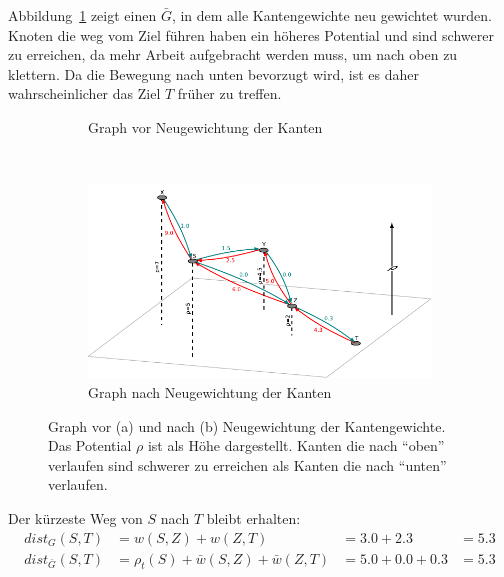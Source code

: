 Abbildung~\ref{fig:astar} zeigt einen $\bar{G}$, in dem alle Kantengewichte neu gewichtet wurden.
Knoten die weg vom Ziel führen haben ein höheres Potential und sind schwerer zu erreichen, da mehr
Arbeit aufgebracht werden muss, um nach oben zu klettern. Da die Bewegung nach unten bevorzugt wird,
ist es daher wahrscheinlicher das Ziel $T$ früher zu treffen.\\
\begin{figure}[h]
    \centering
    \begin{subfigure}[b]{\textwidth}
        \centering
        
        \caption{Graph vor Neugewichtung der Kanten}
    \end{subfigure}
    \\[1em]
    \begin{subfigure}[b]{\textwidth}
        \centering
        \includegraphics{figures/figure_astar_after_pp.pdf}
        \caption{Graph nach Neugewichtung der Kanten}
    \end{subfigure}
    \caption{Graph vor (a) und nach (b) Neugewichtung der Kantengewichte. Das Potential $\rho$ ist
        als Höhe dargestellt. Kanten die nach "`oben"' verlaufen sind schwerer zu erreichen
        als Kanten die nach "`unten"' verlaufen.}
    \label{fig:astar}
\end{figure}

Der kürzeste Weg von $S$ nach $T$ bleibt erhalten:
\begin{align*}
    dist_{G}(S,T)       & = w(S,Z) + w(Z,T)                         & = 3.0 + 2.3       & = 5.3 \\
    dist_{\bar{G}}(S,T) & = \rho_t(S) + \bar{w}(S,Z) + \bar{w}(Z,T) & = 5.0 + 0.0 + 0.3 & = 5.3
\end{align*}

